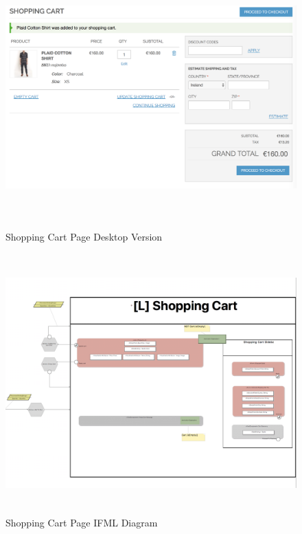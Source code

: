 \newpage
\vspace{0.5cm}
\begin{figure}[H]
  \centering
    \includegraphics[height=10cm]{images/diagrams/before/desktop-shoppingcart.png}
  \caption{Shopping Cart Page Desktop Version}
  \label{fig:desktop-before-shoppingcart}
\end{figure}

\vspace{0.5cm}
\begin{figure}[H]
  \centering
    \includegraphics[height=10cm]{images/diagrams/before/ifml-shoppingcart.png}
  \caption{Shopping Cart Page IFML Diagram}
  \label{fig:ifml-before-shoppingcart}
\end{figure}
\vspace{0.5cm}

